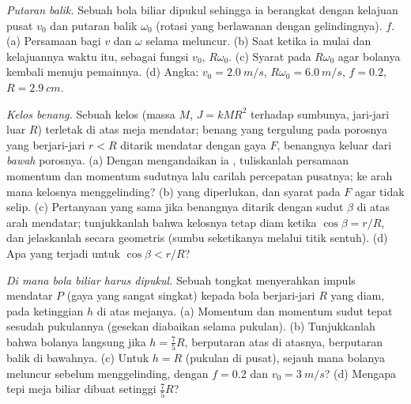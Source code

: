\begin{exercise}[$\star\star$]\label{exo:b2:rigid-body-mechanics:9}
\emph{Putaran balik.} Sebuah bola biliar dipukul sehingga ia berangkat
dengan kelajuan pusat $v_0$ dan putaran balik $\omega_0$ (rotasi yang
berlawanan dengan gelindingnya).  $f$. (a) Persamaan
bagi $v$ dan $\omega$ selama meluncur. (b) Saat ketika ia mulai
 dan kelajuannya waktu itu, sebagai
fungsi $v_0$, $R\omega_0$. (c) Syarat pada $R\omega_0$ agar bolanya
kembali menuju pemainnya. (d) Angka: $v_0 = \qty{2.0}{m/s}$,
$R\omega_0 = \qty{6.0}{m/s}$, $f = 0.2$, $R = \qty{2.9}{cm}$.
\end{exercise}

\begin{exercise}[$\star\star\star$]\label{exo:b2:rigid-body-mechanics:10}
\emph{Kelos benang.} Sebuah kelos (massa $M$, 
$J = kMR^2$ terhadap sumbunya, jari-jari luar $R$) terletak di atas meja
mendatar; benang yang tergulung pada porosnya yang berjari-jari $r < R$
ditarik mendatar dengan gaya $F$, benangnya keluar dari \emph{bawah}
porosnya. (a) Dengan mengandaikan ia ,
tuliskanlah persamaan momentum dan momentum sudutnya lalu carilah
percepatan pusatnya; ke arah mana kelosnya menggelinding? (b)  yang diperlukan, dan syarat pada $F$ agar tidak selip.
(c) Pertanyaan yang sama jika benangnya ditarik dengan sudut $\beta$ di
atas arah mendatar; tunjukkanlah bahwa kelosnya tetap diam ketika
$\cos\beta = r/R$, dan jelaskanlah secara geometris (sumbu seketikanya
melalui titik sentuh). (d) Apa yang terjadi untuk $\cos\beta < r/R$?
\end{exercise}

\begin{exercise}[$\star\star\star$]\label{exo:b2:rigid-body-mechanics:11}
\emph{Di mana bola biliar harus dipukul.} Sebuah tongkat menyerahkan
impuls mendatar $P$ (gaya yang sangat singkat) kepada bola berjari-jari
$R$ yang diam, pada ketinggian $h$ di atas mejanya. (a) Momentum dan
momentum sudut tepat sesudah pukulannya (gesekan diabaikan selama
pukulan). (b) Tunjukkanlah bahwa bolanya langsung  jika $h = \tfrac75R$, berputaran atas di atasnya, berputaran balik
di bawahnya. (c) Untuk $h = R$ (pukulan di pusat), sejauh mana bolanya
meluncur sebelum menggelinding, dengan $f = 0.2$ dan $v_0 = \qty{3}{m/s}$?
(d) Mengapa  tepi meja biliar dibuat setinggi $\tfrac75R$?
\end{exercise}

